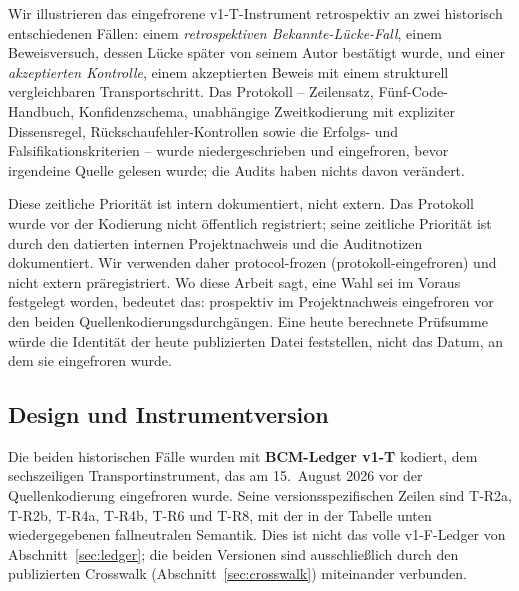 \documentclass[11pt,a4paper]{article}
\begin{document}
Wir illustrieren das eingefrorene v1-T-Instrument retrospektiv an zwei
historisch entschiedenen Fällen: einem \emph{retrospektiven
Bekannte-Lücke-Fall}, einem Beweisversuch, dessen Lücke später von seinem
Autor bestätigt wurde, und einer \emph{akzeptierten Kontrolle}, einem
akzeptierten Beweis mit einem strukturell vergleichbaren Transportschritt.
Das Protokoll -- Zeilensatz, Fünf-Code-Handbuch, Konfidenzschema,
unabhängige Zweitkodierung mit expliziter Dissensregel,
Rückschaufehler-Kontrollen sowie die Erfolgs- und Falsifikationskriterien --
wurde niedergeschrieben und eingefroren, bevor irgendeine Quelle gelesen
wurde; die Audits haben nichts davon verändert.

Diese zeitliche Priorität ist intern dokumentiert, nicht extern. Das
Protokoll wurde vor der Kodierung nicht öffentlich registriert; seine
zeitliche Priorität ist durch den datierten internen Projektnachweis und die
Auditnotizen dokumentiert. Wir verwenden daher \glqq protocol-frozen\grqq{}
(protokoll-eingefroren) und nicht \glqq extern präregistriert\grqq{}. Wo diese Arbeit
sagt, eine Wahl sei im Voraus festgelegt worden, bedeutet das: prospektiv im
Projektnachweis eingefroren vor den beiden Quellenkodierungsdurchgängen. Eine
heute berechnete Prüfsumme würde die Identität der heute publizierten Datei
feststellen, nicht das Datum, an dem sie eingefroren wurde.

\subsection{Design und Instrumentversion}

Die beiden historischen Fälle wurden mit \textbf{BCM-Ledger v1-T} kodiert,
dem sechszeiligen Transportinstrument, das am 15.~August 2026 vor der
Quellenkodierung eingefroren wurde. Seine versionsspezifischen Zeilen sind
T-R2a, T-R2b, T-R4a, T-R4b, T-R6 und T-R8, mit der in der Tabelle unten
wiedergegebenen fallneutralen Semantik. Dies ist nicht das volle
v1-F-Ledger von Abschnitt~\ref{sec:ledger}; die beiden Versionen sind
ausschließlich durch den publizierten Crosswalk
(Abschnitt~\ref{sec:crosswalk}) miteinander verbunden.
\end{document}
